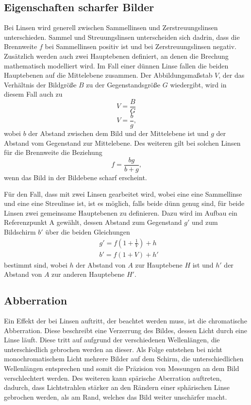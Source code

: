 \subsection{Eigenschaften scharfer Bilder}
    \noindent Bei Linsen wird generell zwischen Sammellinsen und Zerstreuungslinsen unterschieden. Sammel und Streuungslinsen unterscheiden sich dadrin, dass die Brennweite $f$ bei Sammellinsen positiv ist und bei Zerstreuungslinsen negativ.
    Zusätzlich werden auch zwei Hauptebenen definiert, an denen die Brechung mathematisch modelliert wird. Im Fall einer dünnen Linse fallen die beiden Hauptebenen auf die Mittelebene zusammen. Der Abbildungsmaßstab $V$, der das Verhältnis der Bildgröße $B$
    zu der Gegenstandsgröße $G$ wiedergibt, wird in diesem Fall auch zu
    \begin{equation}
        V=\frac{B}{G} 
        \label{eqn:abbildung1}
    \end{equation}
    \begin{equation}
        V=\frac{b}{g} \text{,}
        \label{eqn:abbildung2}
    \end{equation}
    \noindent wobei $b$ der Abstand zwischen dem Bild und der Mittelebene ist und $g$ der Abstand vom Gegenstand zur Mittelebene.
    Des weiteren gilt bei solchen Linsen für die Brennweite die Beziehung
    \begin{equation}
        f=\frac{bg}{b+g} \text{,}
        \label{eqn:brenn1}
    \end{equation}
    \noindent wenn das Bild in der Bildebene scharf erscheint.

    \noindent Für den Fall, dass mit zwei Linsen gearbeitet wird, wobei eine eine Sammellinse und eine eine Streulinse ist, ist es möglich, falls beide dünn genug sind, für beide Linsen zwei gemeinsame Hauptebenen zu definieren.
    Dazu wird im Aufbau ein Referenzpunkt A gewählt, dessen Abstand zum Gegenstand $g'$ und zum Bildschirm $b'$ über die beiden Gleichungen
    \begin{align}
       & g'=f(1+\frac{1}{V})+h \\
        & b'=f(1+V)+h'
        \label{eqn:abbe}
    \end{align}
    bestimmt sind, wobei $h$ der Abstand von $A$ zur Hauptebene $H$ ist und $h'$ der Abstand von $A$ zur anderen Hauptebene $H'$.
\subsection{Abberration}
    \noindent Ein Effekt der bei Linsen auftritt, der beachtet werden muss, ist die chromatische Abberration. Diese beschreibt eine Verzerrung des Bildes, dessen Licht durch eine Linse läuft. Diese tritt auf aufgrund der verschiedenen Wellenlängen, die unterschiedlich gebrochen werden an dieser.
    Als Folge entstehen bei nicht monochromatischem Licht mehrere Bilder auf dem Schirm, die unterschiedlichen Wellenlängen entsprechen und somit die Präzision von Messungen an dem Bild verschlechtert werden. Des weiteren kann spärische Aberration auftreten, dadurch,
    dass Lichtstrahlen stärker an den Rändern einer sphärischen Linse gebrochen werden, als am Rand, welches das Bild weiter unschärfer macht.

